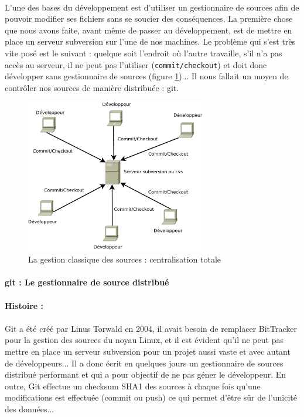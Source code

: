 \paragraph{} L'une des bases du développement est d'utiliser un gestionnaire de sources afin de pouvoir modifier ses fichiers sans se soucier des conséquences. La première chose que nous avons faite, avant même de passer au développement, est de mettre en place un serveur subversion sur l'une de nos machines. Le problème qui s'est très vite posé est le suivant : quelque soit l'endroit où l'autre travaille, s'il n'a pas accès au serveur, il ne peut pas l'utiliser (\verb|commit/checkout|) et doit donc développer sans gestionnaire de sources (figure \ref{svn})... Il nous fallait un moyen de contrôler nos sources de manière distribuée : git.

\begin{figure}[H]
\begin{center}
        \includegraphics[width=0.7\textwidth]{../images/svn.png}
\caption{La gestion classique des sources : centralisation totale }
\label{svn}
\end{center}
\end{figure}


\paragraph{git : Le gestionnaire de source distribué}

\paragraph{Histoire :}
\paragraph{} Git a été créé par Linus Torwald en 2004, il avait besoin de remplacer BitTracker pour la gestion des sources du noyau Linux, et il est évident qu'il ne peut pas mettre en place un serveur subversion pour un projet aussi vaste et avec autant de développeurs... Il a donc écrit en quelques jours un gestionnaire de sources distribué performant et qui a pour objectif de ne pas géner le développeur. En outre, Git effectue un checksum SHA1 des sources à chaque fois qu'une modifications est effectuée (commit ou push) ce qui permet d'être sûr de l'unicité des données...

